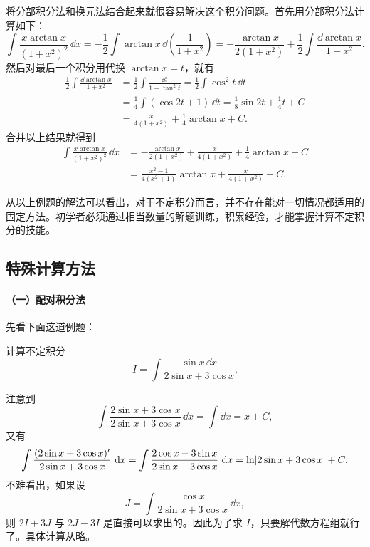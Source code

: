 \begin{xsolution}
将分部积分法和换元法结合起来就很容易解决这个积分问题。首先用分部积分法计算如下：
\[
  \int\frac{x\arctan x}{(1+x^2)^2}\,\dd x
   =-\frac12\int\arctan x\,\dd\left(\frac1{1+x^2}\right)
   =-\frac{\arctan x}{2(1+x^2)}+\frac12\int\frac{\dd\arctan x}{1+x^2}.
\]
然后对最后一个积分用代换 $\arctan x=t$，就有
\begin{align*}
  \frac12\int\frac{\dd\arctan x}{1+x^2}
  &=\frac12\int\frac{\dd t}{1+\tan^2t}
   =\frac12\int\cos^2t\,\dd t\\
  &=\frac14\int(\cos2t+1)\,\dd t
   =\frac18\sin2t+\frac14t+C\\
  &=\frac{x}{4(1+x^2)}+\frac14\arctan x+C.
\end{align*}
合并以上结果就得到
\begin{align*}
  \int\frac{x\arctan x}{(1+x^2)^2}\,\dd x
  &=-\frac{\arctan x}{2(1+x^2)}+\frac{x}{4(1+x^2)}+\frac14\arctan x+C\\
  &=\frac{x^2-1}{4(x^2+1)}\arctan x+\frac{x}{4(1+x^2)}+C.
\end{align*}
\end{xsolution}

\begin{xremark}
从以上例题的解法可以看出，对于不定积分而言，并不存在能对一切情况都适用的固定方法。初学者必须通过相当数量的解题训练，积累经验，才能掌握计算不定积分的技能。
\end{xremark}

\subsection{特殊计算方法}

\paragraph{（一）配对积分法}

先看下面这道例题：

\begin{xexample}[9.1.7]
计算不定积分
\[
  I=\int\frac{\sin x\,\dd x}{2\sin x+3\cos x}.
\]
\end{xexample}

\begin{xsolution}
注意到
\[
  \int\frac{2\sin x+3\cos x}{2\sin x+3\cos x}\,\dd x=\int\dd x=x+C,
\]
又有
\[
  \int\frac{(2\sin x+3\cos x)'}{2\sin x+3\cos x}\,\mathop{}\!\mathrm{d} x
   =\int\frac{2\cos x-3\sin x}{2\sin x+3\cos x}\,\mathop{}\!\mathrm{d} x
   =\ln\lvert2\sin x+3\cos x\rvert+C.
\]
不难看出，如果设
\[
  J=\int\frac{\cos x}{2\sin x+3\cos x}\,\dd x,
\]
则 $2I+3J$ 与 $2J-3I$ 是直接可以求出的。因此为了求 $I$，只要解代数方程组就行了。具体计算从略。
\end{xsolution}

